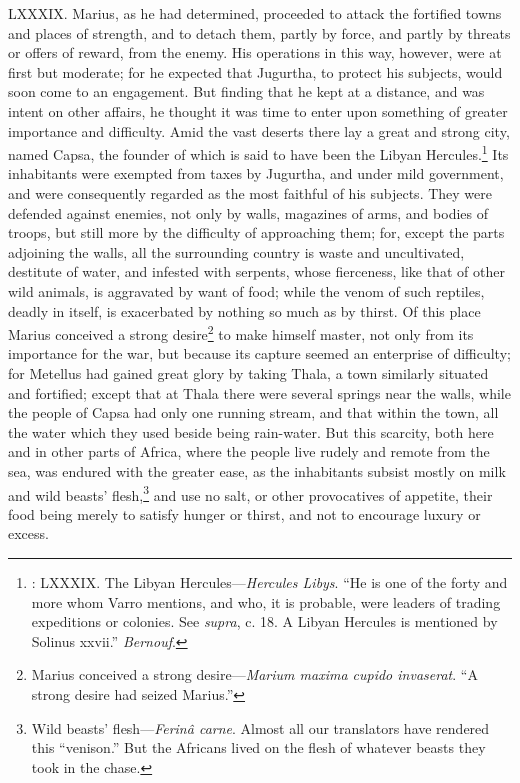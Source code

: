 LXXXIX. Marius, as he had determined, proceeded to attack the
fortified towns and places of strength, and to detach them, partly by
force, and partly by threats or offers of reward, from the enemy. His
operations in this way, however, were at first but moderate; for he
expected that Jugurtha, to protect his subjects, would soon come to an
engagement. But finding that he kept at a distance, and was intent on
other affairs, he thought it was time to enter upon something of
greater importance and difficulty. Amid the vast deserts there lay a
great and strong city, named Capsa, the founder of which is said to have
been the Libyan Hercules.\footnote{: LXXXIX. The Libyan Hercules—\emph{Hercules Libys}. ``He is one of
the forty and more whom Varro mentions, and who, it is probable, were
leaders of trading expeditions or colonies. See \emph{supra}, c. 18. A
Libyan Hercules is mentioned by Solinus xxvii.'' \emph{Bernouf}.} Its inhabitants were exempted from taxes
by Jugurtha, and under mild government, and were consequently regarded
as the most faithful of his subjects. They were defended against enemies,
not only by walls, magazines of arms, and bodies of troops, but still
more by the difficulty of approaching them; for, except the parts
adjoining the walls, all the surrounding country is waste and
uncultivated, destitute of water, and infested with serpents, whose
fierceness, like that of other wild animals, is aggravated by want of
food; while the venom of such reptiles, deadly in itself, is exacerbated
by nothing so much as by thirst. Of this place Marius conceived a strong
desire\footnote{Marius conceived a strong desire—\emph{Marium maxima cupido
invaserat}. ``A strong desire had seized Marius.''} to make himself master, not only from its importance for the
war, but because its capture seemed an enterprise of difficulty; for
Metellus had gained great glory by taking Thala, a town similarly
situated and fortified; except that at Thala there were several springs
near the walls, while the people of Capsa had only one running stream,
and that within the town, all the water which they used beside being
rain-water. But this scarcity, both here and in other parts of Africa,
where the people live rudely and remote from the sea, was endured with
the greater ease, as the inhabitants subsist mostly on milk and wild
beasts' flesh,\footnote{Wild beasts' flesh—\emph{Ferinâ carne}. Almost all our
translators have rendered this ``venison.'' But the Africans lived on
the flesh of whatever beasts they took in the chase.} and use no salt, or other provocatives of appetite,
their food being merely to satisfy hunger or thirst, and not to encourage
luxury or excess.

